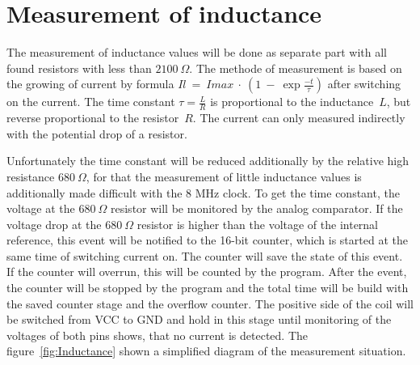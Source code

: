 \section{Measurement of inductance}
The measurement of inductance values will be done as separate part with all found resistors with
less than \(2100~\Omega\).
The methode of measurement is based on the growing of current by formula \(Il~=~Imax~\cdot~(1~-~\exp{\frac{-t}{\tau}})\) 
after switching on the current.
The time constant \(\tau = \frac{L}{R}\) is proportional to the inductance~\(L\), but reverse proportional to the
resistor~\(R\). 
The current can only measured indirectly with the potential drop of a resistor.

Unfortunately the time constant will be reduced additionally by the relative high resistance \(680~\Omega\),
for that the measurement of little inductance values is additionally made difficult with the 8 MHz clock.
To get the time constant, the voltage at the \(680~\Omega\) resistor will be monitored by the analog
comparator.
If the voltage drop at the \(680~\Omega\) resistor is higher than the voltage of the internal reference, this
event will be notified to the 16-bit counter, which is started at the same time of switching current on.
The counter will save the state of this event.
If the counter will overrun, this will be counted by the program.
After the event, the counter will be stopped by the program and the total time will be build with the saved
counter stage and the overflow counter.
The positive side of the coil will be switched from VCC to GND and hold in this stage until  monitoring 
of the voltages of both pins shows, that no current is detected.
The figure~\ref{fig:Inductance} shown a simplified diagram of the measurement situation.

